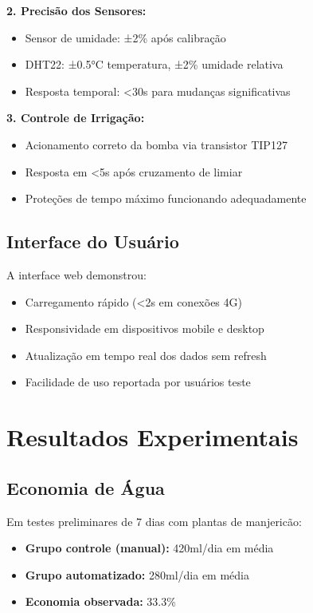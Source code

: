 \documentclass[twoside,english,brazilian]{UNISINOSmonografia}
\begin{document}
\textbf{2. Precisão dos Sensores:}
\begin{itemize}
    \item Sensor de umidade: ±2\% após calibração
    \item DHT22: ±0.5°C temperatura, ±2\% umidade relativa
    \item Resposta temporal: <30s para mudanças significativas
\end{itemize}

\textbf{3. Controle de Irrigação:}
\begin{itemize}
    \item Acionamento correto da bomba via transistor TIP127
    \item Resposta em <5s após cruzamento de limiar
    \item Proteções de tempo máximo funcionando adequadamente
\end{itemize}

\subsection{Interface do Usuário}
A interface web demonstrou:
\begin{itemize}
    \item Carregamento rápido (<2s em conexões 4G)
    \item Responsividade em dispositivos mobile e desktop
    \item Atualização em tempo real dos dados sem refresh
    \item Facilidade de uso reportada por usuários teste
\end{itemize}

\section{Resultados Experimentais}

\subsection{Economia de Água}
Em testes preliminares de 7 dias com plantas de manjericão:
\begin{itemize}
    \item \textbf{Grupo controle (manual):} 420ml/dia em média
    \item \textbf{Grupo automatizado:} 280ml/dia em média  
    \item \textbf{Economia observada:} 33.3\%
\end{itemize}
\end{document}
